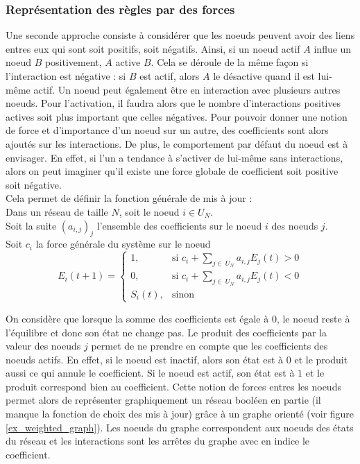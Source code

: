 \documentclass[11pt, a4paper]{article}
\begin{document}
\subsubsection{Représentation des règles par des forces}
Une seconde approche consiste à considérer que les noeuds peuvent avoir des
liens entres eux qui sont soit positifs, soit négatifs. Ainsi, si un noeud
actif $A$ influe un noeud $B$ positivement, $A$ active
$B$. Cela se déroule de la même façon si l'interaction est négative : si $B$
est actif, alors $A$ le désactive quand il est lui-même actif.  Un noeud peut
également être en interaction avec plusieurs autres noeuds.  Pour l'activation,
il faudra alors que le nombre d'interactions positives actives soit plus
important que celles négatives. Pour pouvoir donner une notion de force et
d'importance d'un noeud sur un autre, des coefficients sont alors ajoutés sur
les interactions. De plus, le comportement par défaut du noeud est à envisager.
En effet, si l'un a tendance à s'activer de lui-même sans interactions, alors
on peut imaginer qu'il existe une force globale de coefficient soit positive
soit négative. \\

Cela permet de définir la fonction générale de mis à jour : \\
Dans un réseau de taille $N$, soit le noeud $i \in U_N$. \\
Soit la suite $(a_{i,j})_j$ l'ensemble des coefficients sur le noeud $i$
des noeuds $j$. \\
Soit $c_i$ la force générale du système sur le noeud
\begin{equation} \label{func_maj_weight}
    E_i(t + 1) = \left\{\begin{array}{rl}
            1, & \mbox{si } c_i + \sum_{j\in\ U_N} a_{i, j} E_j(t) > 0 \\
            0, & \mbox{si } c_i + \sum_{j\in\ U_N} a_{i, j} E_j(t) < 0 \\
            S_i(t), & \mbox{sinon}
    \end{array}\right.
\end{equation}

On considère que lorsque la somme des coefficients est égale à $0$, le noeud
reste à l'équilibre et donc son état ne change pas.  Le produit des
coefficients par la valeur des noeuds $j$ permet de ne prendre en compte que
les coefficients des noeuds actifs.  En effet, si le noeud est inactif, alors
son état est à $0$ et le produit aussi ce qui annule le coefficient.  Si le
noeud est actif, son état est à $1$ et le produit correspond bien au
coefficient. Cette notion de forces entres les noeuds permet alors de
représenter graphiquement un réseau booléen en partie (il manque la fonction de
choix des mis à jour) grâce à un graphe orienté (voir figure
\ref{ex_weighted_graph}).  Les noeuds du graphe correspondent aux noeuds des
états du réseau et les interactions sont les arrêtes du graphe avec en indice
le coefficient.
\end{document}
